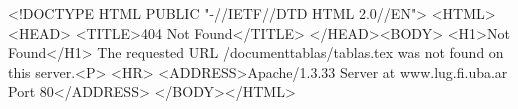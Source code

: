 <!DOCTYPE HTML PUBLIC "-//IETF//DTD HTML 2.0//EN">
<HTML><HEAD>
<TITLE>404 Not Found</TITLE>
</HEAD><BODY>
<H1>Not Found</H1>
The requested URL /documenttablas/tablas.tex was not found on this server.<P>
<HR>
<ADDRESS>Apache/1.3.33 Server at www.lug.fi.uba.ar Port 80</ADDRESS>
</BODY></HTML>
